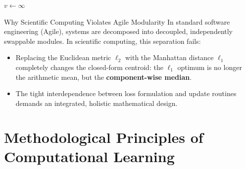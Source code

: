 \begin{algorithm}[H]
\caption{K-Means Algorithm for Euclidean Clustering}\label{alg:kmeans-en}
$v \leftarrow \infty$\;
\;
\end{algorithm}

\begin{noteblock}{Why Scientific Computing Violates Agile Modularity}
In standard software engineering (Agile), systems are decomposed into decoupled, independently swappable modules. In scientific computing, this separation fails:
\begin{itemize}
    \item Replacing the Euclidean metric $\ell_2$ with the Manhattan distance $\ell_1$ completely changes the closed-form centroid: the $\ell_1$ optimum is no longer the arithmetic mean, but the \textbf{component-wise median}.
    \item The tight interdependence between loss formulation and update routines demands an integrated, holistic mathematical design.
\end{itemize}
\end{noteblock}

\FloatBarrier
\section{Methodological Principles of Computational Learning}

